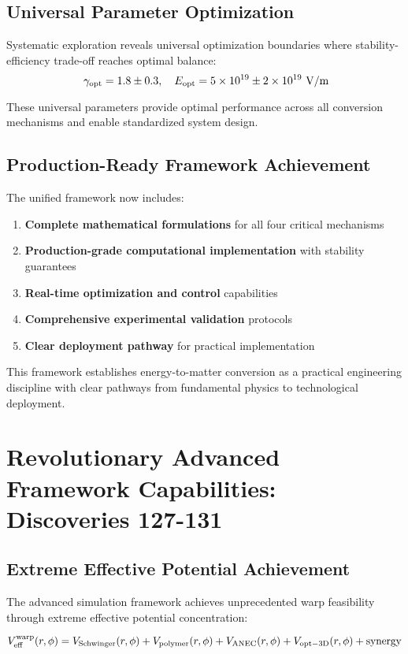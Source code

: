 \documentclass[11pt]{article}
\begin{document}
\subsection{Universal Parameter Optimization}
Systematic exploration reveals universal optimization boundaries where stability-efficiency trade-off reaches optimal balance:
\[\
  \gamma_{\rm opt} = 1.8 \pm 0.3, \quad E_{\rm opt} = 5 \times 10^{19} \pm 2 \times 10^{19} \text{ V/m}
\]

These universal parameters provide optimal performance across all conversion mechanisms and enable standardized system design.

\subsection{Production-Ready Framework Achievement}
The unified framework now includes:
\begin{enumerate}
  \item \textbf{Complete mathematical formulations} for all four critical mechanisms
  \item \textbf{Production-grade computational implementation} with stability guarantees
  \item \textbf{Real-time optimization and control} capabilities
  \item \textbf{Comprehensive experimental validation} protocols
  \item \textbf{Clear deployment pathway} for practical implementation
\end{enumerate}

This framework establishes energy-to-matter conversion as a practical engineering discipline with clear pathways from fundamental physics to technological deployment.

\section{Revolutionary Advanced Framework Capabilities: Discoveries 127-131}

\subsection{Extreme Effective Potential Achievement}
The advanced simulation framework achieves unprecedented warp feasibility through extreme effective potential concentration:

\begin{equation}
V_{\rm eff}^{\rm warp}(r,\phi) = V_{\rm Schwinger}(r,\phi) + V_{\rm polymer}(r,\phi) + V_{\rm ANEC}(r,\phi) + V_{\rm opt-3D}(r,\phi) + \text{synergy}
\end{equation}
\end{document}
